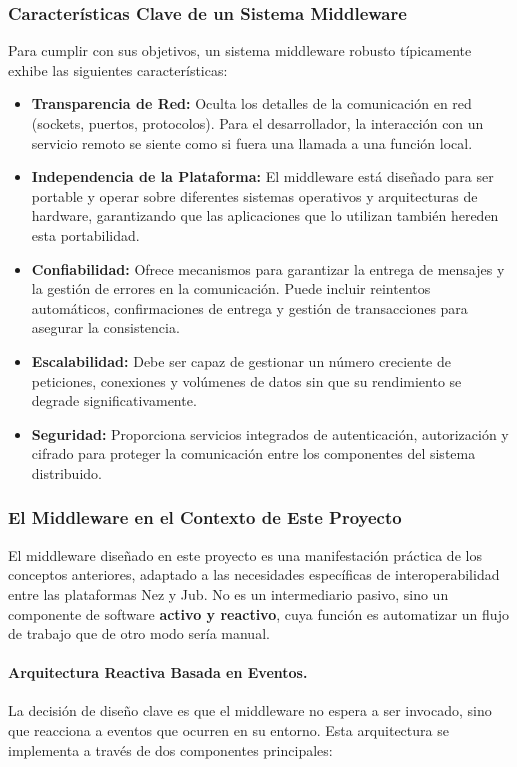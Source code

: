 \subsubsection{Características Clave de un Sistema Middleware}
Para cumplir con sus objetivos, un sistema middleware robusto típicamente exhibe las siguientes características:
\begin{itemize}
    \item \textbf{Transparencia de Red:} Oculta los detalles de la comunicación en red (sockets, puertos, protocolos). Para el desarrollador, la interacción con un servicio remoto se siente como si fuera una llamada a una función local.
    \item \textbf{Independencia de la Plataforma:} El middleware está diseñado para ser portable y operar sobre diferentes sistemas operativos y arquitecturas de hardware, garantizando que las aplicaciones que lo utilizan también hereden esta portabilidad.
    \item \textbf{Confiabilidad:} Ofrece mecanismos para garantizar la entrega de mensajes y la gestión de errores en la comunicación. Puede incluir reintentos automáticos, confirmaciones de entrega y gestión de transacciones para asegurar la consistencia.
    \item \textbf{Escalabilidad:} Debe ser capaz de gestionar un número creciente de peticiones, conexiones y volúmenes de datos sin que su rendimiento se degrade significativamente.
    \item \textbf{Seguridad:} Proporciona servicios integrados de autenticación, autorización y cifrado para proteger la comunicación entre los componentes del sistema distribuido.
\end{itemize}

\subsubsection{El Middleware en el Contexto de Este Proyecto}
El middleware diseñado en este proyecto es una manifestación práctica de los conceptos anteriores, adaptado a las necesidades específicas de interoperabilidad entre las plataformas Nez y Jub. No es un intermediario pasivo, sino un componente de software \textbf{activo y reactivo}, cuya función es automatizar un flujo de trabajo que de otro modo sería manual.

\paragraph{Arquitectura Reactiva Basada en Eventos.}
La decisión de diseño clave es que el middleware no espera a ser invocado, sino que reacciona a eventos que ocurren en su entorno. Esta arquitectura se implementa a través de dos componentes principales:

